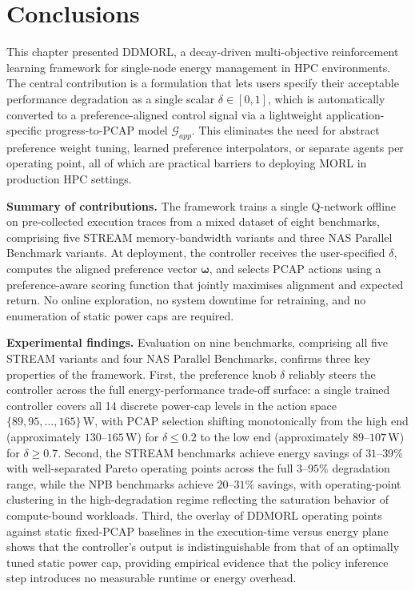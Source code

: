 \section{Conclusions}
\label{sec:conclusions}

This chapter presented DDMORL, a decay-driven multi-objective reinforcement learning framework for single-node energy management in HPC environments. The central contribution is a formulation that lets users specify their acceptable performance degradation as a single scalar $\delta \in [0,1]$, which is automatically converted to a preference-aligned control signal via a lightweight application-specific progress-to-PCAP model $\mathcal{G}_{app}$. This eliminates the need for abstract preference weight tuning, learned preference interpolators, or separate agents per operating point, all of which are practical barriers to deploying MORL in production HPC settings.

\noindent\textbf{Summary of contributions.}
The framework trains a single Q-network offline on pre-collected execution traces from a mixed dataset of eight benchmarks, comprising five STREAM memory-bandwidth variants and three NAS Parallel Benchmark variants. At deployment, the controller receives the user-specified $\delta$, computes the aligned preference vector $\boldsymbol{\omega}$, and selects PCAP actions using a preference-aware scoring function that jointly maximises alignment and expected return. No online exploration, no system downtime for retraining, and no enumeration of static power caps are required.

\noindent\textbf{Experimental findings.}
Evaluation on nine benchmarks, comprising all five STREAM variants and four NAS Parallel Benchmarks, confirms three key properties of the framework. First, the preference knob $\delta$ reliably steers the controller across the full energy-performance trade-off surface: a single trained controller covers all 14 discrete power-cap levels in the action space $\{89, 95, \ldots, 165\}$\,W, with PCAP selection shifting monotonically from the high end (approximately $130$--$165$\,W) for $\delta \leq 0.2$ to the low end (approximately $89$--$107$\,W) for $\delta \geq 0.7$. Second, the STREAM benchmarks achieve energy savings of $31$--$39\%$ with well-separated Pareto operating points across the full $3$--$95\%$ degradation range, while the NPB benchmarks achieve $20$--$31\%$ savings, with operating-point clustering in the high-degradation regime reflecting the saturation behavior of compute-bound workloads. Third, the overlay of DDMORL operating points against static fixed-PCAP baselines in the execution-time versus energy plane shows that the controller's output is indistinguishable from that of an optimally tuned static power cap, providing empirical evidence that the policy inference step introduces no measurable runtime or energy overhead.

